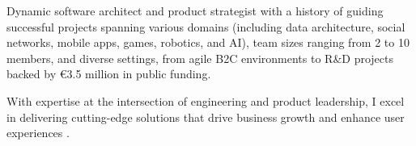 


\begin{cvparagraph}


Dynamic software architect and product strategist with a history of guiding successful projects spanning various domains (including data architecture, social networks, mobile apps, games, robotics, and AI), team sizes ranging from 2 to 10 members, and diverse settings, from agile B2C environments to R\&D projects backed by €3.5 million in public funding.

With expertise at the intersection of engineering and product leadership, I excel in delivering cutting-edge solutions that drive business growth and enhance user experiences .

\end{cvparagraph}
